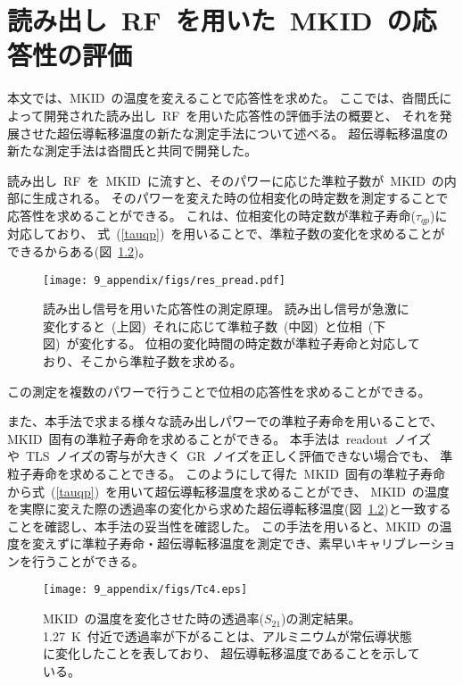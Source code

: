 \chapter{読み出し~RF~を用いた~MKID~の応答性の評価}

本文では、MKID~の温度を変えることで応答性を求めた。
ここでは、沓間氏によって開発された読み出し~RF~を用いた応答性の評価手法\cite{kutsuma1}の概要と、
それを発展させた超伝導転移温度の新たな測定手法について述べる。
超伝導転移温度の新たな測定手法は沓間氏と共同で開発した\cite{kutsuma2}。

読み出し~RF~を~MKID~に流すと、そのパワーに応じた準粒子数が~MKID~の内部に生成される。
そのパワーを変えた時の位相変化の時定数を測定することで応答性を求めることができる。
これは、位相変化の時定数が準粒子寿命($\tau_{qp}$)に対応しており、
式~(\ref{tauqp})~を用いることで、準粒子数の変化を求めることができるからある(図~\ref{res_pread})。
\begin{figure}[htbp]
  \centering
  \texttt{[image: 9\_appendix/figs/res\_pread.pdf]}
  \caption{読み出し信号を用いた応答性の測定原理\cite{kutsuma1}。 
  読み出し信号が急激に変化すると~(上図)~それに応じて準粒子数~(中図)~と位相~(下図)~が変化する。
  位相の変化時間の時定数が準粒子寿命と対応しており、そこから準粒子数を求める。}
  \label{res_pread}
\end{figure}
この測定を複数のパワーで行うことで位相の応答性を求めることができる。


また、本手法で求まる様々な読み出しパワーでの準粒子寿命を用いることで、
MKID~固有の準粒子寿命を求めることができる。
本手法は~readout~ノイズや~TLS~ノイズの寄与が大きく~GR~ノイズを正しく評価できない場合でも、
準粒子寿命を求めることできる。
このようにして得た~MKID~固有の準粒子寿命から式~(\ref{tauqp})~を用いて超伝導転移温度を求めることができ、
MKID~の温度を実際に変えた際の透過率の変化から求めた超伝導転移温度(図~\ref{res_pread})と一致することを確認し、本手法の妥当性を確認した。
この手法を用いると、MKID~の温度を変えずに準粒子寿命・超伝導転移温度を測定でき、素早いキャリブレーションを行うことができる。

\begin{figure}[htbp]
  \centering
  \texttt{[image: 9\_appendix/figs/Tc4.eps]}
  \caption{MKID~の温度を変化させた時の透過率($S_{21}$)の測定結果。
  1.27~K~付近で透過率が下がることは、アルミニウムが常伝導状態に変化したことを表しており、
  超伝導転移温度であることを示している。}
  \label{res_pread}
\end{figure}


